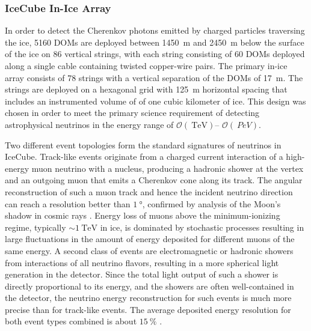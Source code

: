 \subsubsection{IceCube In-Ice Array}

In order to detect the Cherenkov photons emitted by charged particles
traversing the ice, \num{5160} DOMs are deployed between \SI{1450}{\meter}
and \SI{2450} {\meter} below the surface of the ice on \num{86} vertical
strings, with each string consisting of \num{60} DOMs deployed along a
single cable containing twisted copper-wire pairs. The 
primary in-ice array consists of \num{78} strings with a vertical
separation of the DOMs of \SI{17}{\meter}.  The strings are
deployed on a hexagonal grid with \SI{125}{\meter} horizontal spacing
that includes an instrumented volume of of one cubic kilometer of ice.  This design was chosen in
order to meet the primary science requirement of detecting astrophysical
neutrinos in the energy range of $\mathcal{O}(\SI{}{\tera\electronvolt})$--
$\mathcal{O}(\SI{}{PeV})$.  %

Two different event topologies form the standard signatures of neutrinos in
IceCube.  Track-like events originate from a charged current interaction of
a high-energy muon neutrino with a nucleus, producing a hadronic shower at
the vertex and an outgoing muon that emits a Cherenkov cone along its
track.  The angular reconstruction of such a muon track and hence the
incident neutrino direction can reach a resolution better than
$\SI{1}{\degree}$, confirmed by analysis of the Moon's shadow
in cosmic rays \cite{IC3:moon}. Energy loss of muons above the minimum-ionizing regime, typically $ \sim
\SI{1}{\tera\electronvolt}$ in ice, is dominated by stochastic
processes resulting in large fluctuations in the amount of energy deposited
for different muons of the same energy.  A second class of events are
electromagnetic or hadronic showers from interactions of all neutrino
flavors, resulting in a more spherical light generation in the detector.
Since the total light output of such a shower is directly proportional to its energy, and
the showers are often well-contained in the detector, the neutrino energy
reconstruction for such events is much more precise than for track-like
events. The average deposited energy resolution for both event types
combined is about $\SI{15}{\%}$ \cite{IC3:ereco}. 

